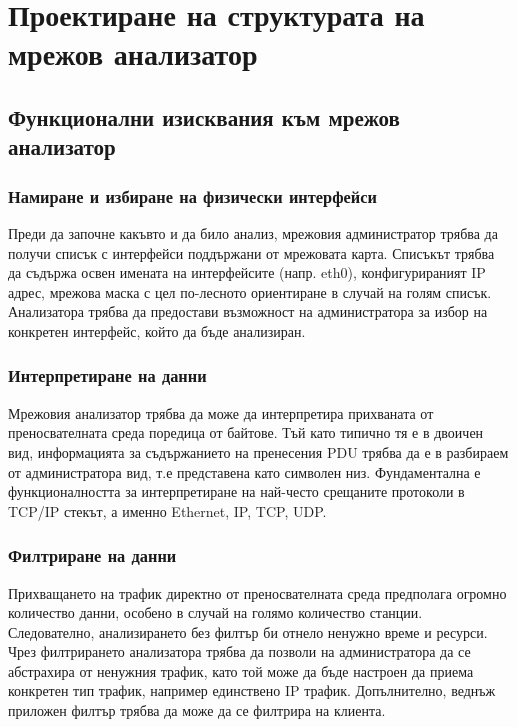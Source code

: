 \documentclass[12pt,a4paper,oneside]{book}
\begin{document}
\chapter{Проектиране на структурата на мрежов анализатор}

\section{Функционални изисквания към мрежов анализатор}

\subsection{Намиране и избиране на физически интерфейси}

Преди да започне какъвто и да било анализ, мрежовия администратор трябва да
получи списък с интерфейси поддържани от мрежовата карта. Списъкът трябва да
съдържа освен имената на интерфейсите (напр. eth0), конфигурираният IP адрес,
мрежова маска с цел по-лесното ориентиране в случай на голям списък.
Анализатора трябва да предостави възможност на администратора за избор на
конкретен интерфейс, който да бъде анализиран.

\subsection{Интерпретиране на данни}

Мрежовия анализатор трябва да може да интерпретира прихваната от преносвателната
среда поредица от байтове. Тъй като типично тя е в двоичен вид, информацията за
съдържанието на пренесения PDU трябва да е в разбираем от администратора вид,
т.е представена като символен низ. Фундаментална е функционалността за
интерпретиране на най-често срещаните протоколи в TCP/IP стекът, а именно
Ethernet, IP, TCP, UDP.

\subsection{Филтриране на данни}

Прихващането на трафик директно от преносвателната среда предполага огромно
количество данни, особено в случай на голямо количество станции. Следователно,
анализирането без филтър би отнело ненужно време и ресурси. Чрез филтрирането
анализатора трябва да позволи на администратора да се абстрахира от ненужния
трафик, като той може да бъде настроен да приема конкретен тип трафик, например
единствено IP трафик. Допълнително, веднъж приложен филтър трябва да може да се
филтрира на клиента.
\end{document}
